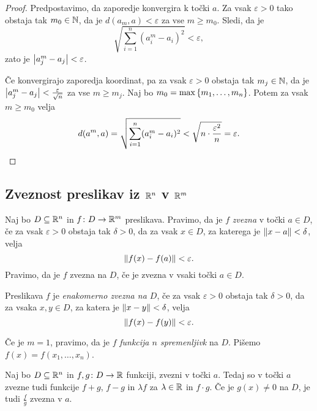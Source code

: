\begin{proof}
Predpostavimo, da zaporedje konvergira k točki $a$. Za vsak
$\varepsilon>0$ tako obstaja tak $m_0 \in \mathbb{N}$, da je
$d(a_m,a) < \varepsilon$ za vse $m \geq m_0$. Sledi, da je
\[
\sqrt{\sum_{i=1}^n \left(a_i^m - a_i\right)^2} < \varepsilon,
\]
zato je $\left\lvert a_j^m - a_j\right\rvert < \varepsilon$.

Če konvergirajo zaporedja koordinat, pa za vsak $\varepsilon>0$
obstaja tak $m_j \in \mathbb{N}$, da je
$\left\lvert a_j^m - a_j\right\rvert < \frac{\varepsilon}{\sqrt{n}}$ za vse
$m \geq m_j$. Naj bo $m_0 = \max\left\{m_1, \dots, m_n\right\}$. Potem za
vsak $m \geq m_0$ velja
\[
d(a^m,a) = \sqrt{\sum_{i=1}^n (a_i^m - a_i)^2}
< \sqrt{n \cdot \frac{\varepsilon^2}{n}} = \varepsilon. \qedhere
\]
\end{proof}

\newpage

\subsection{Zveznost preslikav iz $\mathbb{R}^n$ v $\mathbb{R}^m$}

\begin{definicija}
Naj bo $D \subseteq \mathbb{R}^n$ in $f \colon D\to\mathbb{R}^m$ preslikava.
Pravimo, da je $f$ \emph{zvezna} v točki
$a\in D$, če za vsak $\varepsilon > 0$ obstaja tak $\delta > 0$, da
za vsak $x \in D$, za katerega je $\left\lVert x - a\right\rVert < \delta$, velja
\[
\left\lVert f(x) - f(a)\right\rVert < \varepsilon.
\]
Pravimo, da je $f$ zvezna na $D$, če je zvezna v vsaki točki
$a \in D$.
\end{definicija}

\begin{definicija}
Preslikava $f$ je
\emph{enakomerno zvezna na $D$},
če za vsak $\varepsilon > 0$ obstaja tak $\delta > 0$, da za vsaka
$x,y \in D$, za katera je $\left\lVert x - y\right\rVert < \delta$, velja
\[
\left\lVert f(x) - f(y)\right\rVert < \varepsilon.
\]
\end{definicija}

\begin{opomba}
Če je $m = 1$, pravimo, da je $f$
\emph{funkcija $n$ spremenljivk}
na $D$. Pišemo $f(x) = f(x_1, \dots, x_n)$.
\end{opomba}

\begin{izrek}
Naj bo $D \subseteq \mathbb{R}^n$ in $f, g \colon D \to \mathbb{R}$ funkciji,
zvezni v točki $a$. Tedaj so v točki $a$ zvezne tudi funkcije
$f + g$, $f - g$ in $\lambda f$ za $\lambda \in \mathbb{R}$ in $f\cdot g$.
Če je $g(x) \ne 0$ na $D$, je tudi $\frac{f}{g}$ zvezna v $a$.
\end{izrek}

